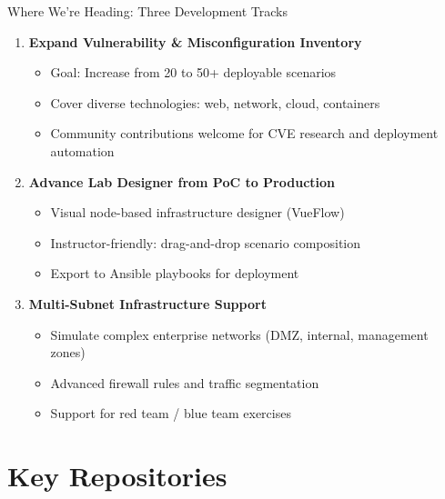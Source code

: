 \documentclass[aspectratio=169]{beamer}
\begin{document}
\begin{frame}{Where We're Heading: Three Development Tracks \; \faRoad}
  \begin{enumerate}
    \item \textbf{Expand Vulnerability \& Misconfiguration Inventory}
    \begin{itemize}
      \item Goal: Increase from 20 to 50+ deployable scenarios
      \item Cover diverse technologies: web, network, cloud, containers
      \item Community contributions welcome for CVE research and deployment automation
    \end{itemize}
    
    \item \textbf{Advance Lab Designer from PoC to Production}
    \begin{itemize}
      \item Visual node-based infrastructure designer (VueFlow)
      \item Instructor-friendly: drag-and-drop scenario composition
      \item Export to Ansible playbooks for deployment
    \end{itemize}
    
    \item \textbf{Multi-Subnet Infrastructure Support}
    \begin{itemize}
      \item Simulate complex enterprise networks (DMZ, internal, management zones)
      \item Advanced firewall rules and traffic segmentation
      \item Support for red team / blue team exercises
    \end{itemize}
  \end{enumerate}
\end{frame}

\section{Key Repositories}
\end{document}
